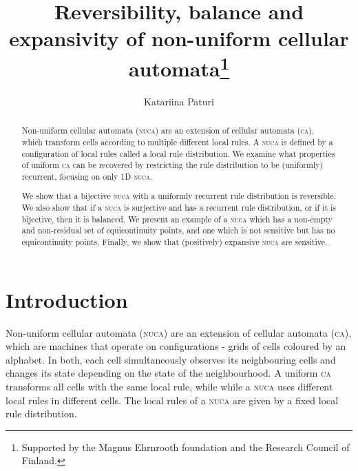 \documentclass[runningheads]{llncs}
\begin{document}
%
\title{Reversibility, balance and expansivity of non-uniform cellular automata\thanks{Supported by the Magnus Ehrnrooth foundation and the Research Council of Finland.}}
%
%
\author{Katariina Paturi}
%
%
%
\maketitle              %
%
\begin{abstract}
Non-uniform cellular automata (\textsc{nuca}) are an extension of cellular automata (\textsc{ca}), which transform cells according to multiple different local rules.  A \textsc{nuca} is defined by a configuration of local rules called a local rule distribution. We examine what properties of uniform \textsc{ca} can be recovered by restricting the rule distribution to be (uniformly) recurrent, focusing on only 1D \textsc{nuca}.

We show that a bijective \textsc{nuca} with a uniformly recurrent rule distribution is reversible. We also show that if a \textsc{nuca} is surjective and has a recurrent rule distribution, or if it is bijective, then it is balanced. We present an example of a \textsc{nuca} which has a non-empty and non-residual set of equicontinuity points, and one which is not sensitive but has no equicontinuity points. Finally, we show that (positively) expansive \textsc{nuca} are sensitive.

\end{abstract}
%
%
%
\section{Introduction}

Non-uniform cellular automata (\textsc{nuca}) are an extension of cellular automata (\textsc{ca}), which are machines that operate on configurations - grids of cells coloured by an alphabet. In both, each cell simultaneously observes its neighbouring cells and changes its state depending on the state of the neighbourhood. A uniform \textsc{ca} transforms all cells with the same local rule, while while a \textsc{nuca} uses different local rules in different cells. The local rules of a \textsc{nuca} are given by a fixed local rule distribution. 
\end{document}
